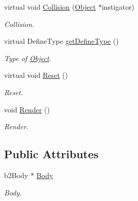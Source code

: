 \begin{DoxyCompactItemize}
virtual void \hyperlink{class_object_a0af60ea226dcb885e69483452d34a47a}{Collision} (\hyperlink{class_object}{Object} $\ast$instigator)
\begin{DoxyCompactList}\small\item\em Collision. \end{DoxyCompactList}\item 
\mbox{\label{class_object_a9ebf9ef807739f25a04711b90eb82176}} 
virtual Define\+Type \hyperlink{class_object_a9ebf9ef807739f25a04711b90eb82176}{get\+Define\+Type} ()
\begin{DoxyCompactList}\small\item\em Type of \hyperlink{class_object}{Object}. \end{DoxyCompactList}\item 
\mbox{\label{class_object_ad0c9d66295332df63702940065dbe029}} 
virtual void \hyperlink{class_object_ad0c9d66295332df63702940065dbe029}{Reset} ()
\begin{DoxyCompactList}\small\item\em Reset. \end{DoxyCompactList}\item 
\mbox{\label{class_object_a2199afbf2f52ff746c4c871e434ff20f}} 
void \hyperlink{class_object_a2199afbf2f52ff746c4c871e434ff20f}{Render} ()
\begin{DoxyCompactList}\small\item\em Render. \end{DoxyCompactList}\end{DoxyCompactItemize}
\subsection*{Public Attributes}
\begin{DoxyCompactItemize}
\item 
\mbox{\label{class_object_a629453451f52924956cf615606a59471}} 
b2\+Body $\ast$ \hyperlink{class_object_a629453451f52924956cf615606a59471}{Body}
\begin{DoxyCompactList}\small\item\em Body. \end{DoxyCompactList}\end{DoxyCompactItemize}
